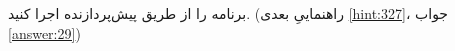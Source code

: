 \section{}
\paragraph{}\label{hint:28}
برنامه را از طریق پیش‌پردازنده اجرا کنید. (راهنماییِ بعدی \ref{hint:327}، جواب \ref{answer:29})